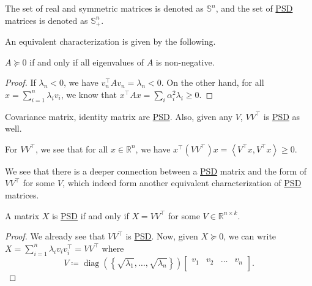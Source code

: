 \begin{notation}
	The set of real and symmetric matrices is denoted as \(\mathbb{S} ^n\), and the set of \hyperref[def:PSD]{PSD} matrices is denoted as \(\mathbb{S} ^n_+\).
\end{notation}

An equivalent characterization is given by the following.

\begin{lemma}\label{lma:PSD-non-negative-eigenvalue}
	\(A \succeq 0 \) if and only if all eigenvalues of \(A\) is non-negative.
\end{lemma}
\begin{proof}
	If \(\lambda _n < 0\), we have \(v_n ^{\top} A v_n = \lambda _n < 0\). On the other hand, for all \(x = \sum_{i=1}^n \lambda _i v_i \), we know that \(x^{\top} A x = \sum_{i} \alpha _i ^{2} \lambda _i \geq 0\).
\end{proof}

\begin{eg}
	Covariance matrix, identity matrix are \hyperref[def:PSD]{PSD}. Also, given any \(V\), \(V V^{\top} \) is \hyperref[def:PSD]{PSD} as well.
\end{eg}
\begin{explanation}
	For \(V V^{\top}\), we see that for all \(x\in \mathbb{R} ^n\), we have \(x^{\top} (V V^{\top} )x = \left\langle V^{\top} x, V^{\top} x \right\rangle \geq 0\).
\end{explanation}

We see that there is a deeper connection between a \hyperref[def:PSD]{PSD} matrix and the form of \(V V^{\top} \) for some \(V\), which indeed form another equivalent characterization of \hyperref[def:PSD]{PSD} matrices.

\begin{lemma}\label{lma:lec14-1}
	A matrix \(X\) is \hyperref[def:PSD]{PSD} if and only if \(X = V V^{\top} \) for some \(V\in \mathbb{R} ^{n\times k}\).
\end{lemma}
\begin{proof}
	We already see that \(V V^{\top} \) is \hyperref[def:PSD]{PSD}. Now, given \(X \succeq 0\), we can write \(X = \sum_{i=1} ^n \lambda _i v_i v_i ^{\top} = V V^{\top} \) where
	\[
		V\coloneqq \mathop{\mathrm{diag}}\left( \left\{ \sqrt{\lambda _1}, \dots , \sqrt{\lambda _n} \right\} \right)  \begin{bmatrix}
			v_1 & v_2 & \dots & v_n \\
		\end{bmatrix}.
	\]
\end{proof}

